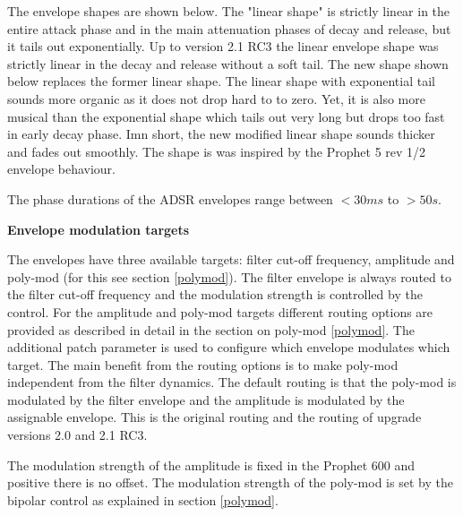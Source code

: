  The envelope shapes are shown below. The "linear shape" is strictly linear in the entire attack phase and in the main attenuation phases of decay and release, but it tails out exponentially. Up to version 2.1 RC3 the linear envelope shape was strictly linear in the decay and release without a soft tail. The new shape shown below replaces the former linear shape. The linear shape with exponential tail sounds more organic as it does not drop hard to to zero. Yet, it is also more musical than the exponential shape which tails out very long but drops too fast in early decay phase. Imn short, the new modified linear shape sounds thicker and fades out smoothly. The shape is was inspired by the Prophet 5 rev 1/2 envelope behaviour. 
 

The phase durations of the ADSR envelopes range between $<30 ms$ to $>50 s$.

\textbf{Envelope modulation targets}
 
The envelopes have three available targets: filter cut-off frequency, amplitude and poly-mod (for this see section \ref{polymod}). The filter envelope is always routed to the filter cut-off frequency and the modulation strength is controlled by the \filenv control. For the  amplitude and poly-mod targets different routing options are provided as described in detail in the section on poly-mod \ref{polymod}. The additional patch parameter \envrouting is used to configure which envelope modulates which target. The main benefit from the routing options is to make poly-mod independent from the filter dynamics. The default routing is that the poly-mod is modulated by the filter envelope and the amplitude is modulated by the assignable envelope. This is the original routing and the routing of upgrade versions 2.0 and 2.1 RC3. 

The modulation strength of the amplitude is fixed in the Prophet 600 and positive there is no offset. The modulation strength of the poly-mod is set by the bipolar \polyenv control as explained in section \ref{polymod}. 
